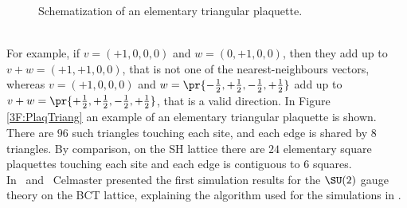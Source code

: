 \begin{figure}[!hbtp]
    \centering
    \caption{Schematization of an elementary triangular plaquette.}
    \label{3F:PlaqTriang}
\end{figure}\\
For example, if $v=(+1,0,0,0)$ and $w=(0,+1,0,0)$, then they add up to $v+w=(+1,+1,0,0)$, that is not one of the nearest-neighbours vectors, whereas $v=(+1,0,0,0)$ and $w=\pr{-\frac12,+\frac12,-\frac12,+\frac12}$ add up to $v+w=\pr{+\frac12,+\frac12,-\frac12,+\frac12}$, that is a valid direction.
In Figure \eqref{3F:PlaqTriang} an example of an elementary triangular plaquette is shown.\\
There are $96$ such triangles touching each site, and each edge is shared by $8$ triangles.
By comparison, on the SH lattice there are $24$ elementary square plaquettes touching each site and each edge is contiguous to $6$ squares.\\
In~\cite{Celmaster:1983hs} and~\cite{Celmaster:1983vy} Celmaster presented the first simulation results for the $\SU(2)$ gauge theory on the BCT lattice, explaining the algorithm used for the simulations in \cite{CELMASTER1985415}.

